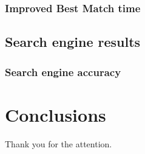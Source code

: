 \documentclass{beamer}
\begin{document}
\begin{frame}
\frametitle{Improved Best Match time}
\begin{center}
\end{center}
\end{frame}

\subsection{Search engine results}
\begin{frame}
\frametitle{Search engine accuracy}
\end{frame}

\section{Conclusions}
\begin{frame}
\centering 
\Huge{Thank you for the attention.}
\end{frame}
\end{document}
